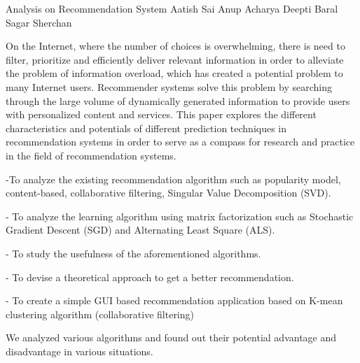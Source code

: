  \begin{conf-abstract}[]
 {Analysis on Recommendation System }
 { Aatish Sai
 	Anup Acharya
 	Deepti Baral
 	Sagar Sherchan
 }
{}


On the Internet, where the number of choices is overwhelming, there is need to filter, prioritize and efficiently deliver relevant information in order to alleviate the problem of information overload, which has created a potential problem to many Internet users. Recommender systems solve this problem by searching through the large volume of dynamically generated information to provide users with personalized content and services. This paper explores the different characteristics and potentials of different prediction techniques in recommendation systems in order to serve as a compass for research and practice in the field of recommendation systems.

-To analyze the existing recommendation algorithm such as
popularity model, content-based, collaborative filtering, Singular
Value Decomposition (SVD).

- To analyze the learning algorithm using matrix factorization such as
Stochastic Gradient Descent (SGD) and Alternating Least Square
(ALS).

- To study the usefulness of the aforementioned algorithms.

- To devise a theoretical approach to get a better recommendation.

- To create a simple GUI based recommendation application based on
K-mean clustering algorithm (collaborative filtering)

We analyzed various algorithms and found out their potential advantage and disadvantage in various situations.
 
\end{conf-abstract}
